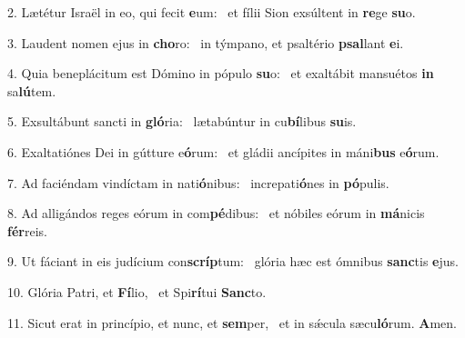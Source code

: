 2. Lætétur Israël in eo, qui fecit \textbf{e}um: \ast\  et fílii Sion exsúltent in \textbf{re}ge \textbf{su}o.\

3. Laudent nomen ejus in \textbf{cho}ro: \ast\  in týmpano, et psaltério \textbf{psal}lant \textbf{e}i.\

4. Quia beneplácitum est Dómino in pópulo \textbf{su}o: \ast\  et exaltábit mansuétos \textbf{in} sa\textbf{lú}tem.\

5. Exsultábunt sancti in \textbf{gló}ria: \ast\  lætabúntur in cu\textbf{bí}libus \textbf{su}is.\

6. Exaltatiónes Dei in gútture e\textbf{ó}rum: \ast\  et gládii ancípites in máni\textbf{bus} e\textbf{ó}rum.\

7. Ad faciéndam vindíctam in nati\textbf{ó}nibus: \ast\  increpati\textbf{ó}nes in \textbf{pó}pulis.\

8. Ad alligándos reges eórum in com\textbf{pé}dibus: \ast\  et nóbiles eórum in \textbf{má}nicis \textbf{fér}reis.\

9. Ut fáciant in eis judícium con\textbf{scríp}tum: \ast\  glória hæc est ómnibus \textbf{sanc}tis \textbf{e}jus.\

10. Glória Patri, et \textbf{Fí}lio, \ast\  et Spi\textbf{rí}tui \textbf{Sanc}to.\

11. Sicut erat in princípio, et nunc, et \textbf{sem}per, \ast\  et in sǽcula sæcu\textbf{ló}rum. \textbf{A}men.\

